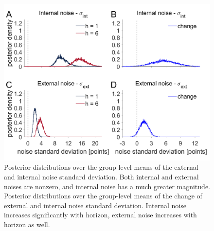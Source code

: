 \documentclass[12pt]{article}
\begin{document}
	\begin{figure}[H]
		\begin{center}
			\includegraphics[width=1\textwidth]{figures/hyperprior.png}
			\caption[Posterior distributions over the group-level noise standard deviation of the external and internal noise variance.]{Posterior distributions over the group-level means of the external and internal noise standard deviation. Both internal and external noises are nonzero, and internal noise has a much greater magnitude. Posterior distributions over the group-level means of the change of external and internal noise standard deviation. Internal noise increases significantly with horizon, external noise increases with horizon as well.}
			\label{fig:mb12}
		\end{center}
	\end{figure}
	
	
\end{document}
